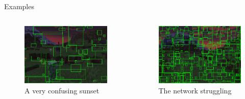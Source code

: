 \documentclass[english]{beamer}
\begin{document}
\begin{frame}{Examples}
	\begin{columns}
	    
	    \begin{column}{0.5\textwidth}
    		\begin{figure}
	    \centering
	    \includegraphics[width=1.0\textwidth]{../images/sunset2.jpeg}
	   \caption{A very confusing sunset}
		\end{figure}
	    \end{column}
	
	    \begin{column}{0.5\textwidth}
	      \begin{figure}
	        \centering
	            \includegraphics[width=1.0\textwidth]{../images/sunset.png}
	            \caption{The network struggling}
	        \end{figure}
	    \end{column}
	  \end{columns}
\end{frame}
\end{document}
